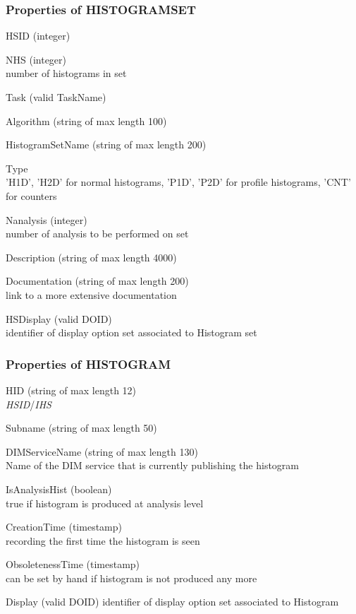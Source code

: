 \documentclass{lhcbnote}
\begin{document}
\subsubsection{Properties of HISTOGRAMSET}
\begin{description}
\item{HSID} (integer)
\item{NHS} (integer)\\
number of histograms in set
\item{Task} (valid TaskName) 
\item{Algorithm} (string of max length 100) 
\item{HistogramSetName} (string of max length 200) 
\item{Type} \\
'H1D', 'H2D' for normal histograms, 'P1D', 'P2D' for profile
histograms, 'CNT' for counters
\item{Nanalysis} (integer)\\
number of analysis to be performed on set
\item{Description} (string of max length 4000) 
\item{Documentation} (string of max length 200)\\
link to a more extensive documentation
\item{HSDisplay} (valid DOID)\\
identifier of display option set associated to Histogram set 
\end{description}

\subsubsection{Properties of HISTOGRAM}
\begin{description}
\item{HID} (string of max length 12)\\
{\it HSID}/{\it IHS}
\item{Subname} (string of max length 50)
\item{DIMServiceName} (string of max length 130)\\
Name of the DIM service that is currently publishing the histogram 
\item{IsAnalysisHist} (boolean)\\
true if histogram is produced at analysis level
\item{CreationTime} (timestamp)\\
recording the first time the histogram is seen
\item{ObsoletenessTime} (timestamp)\\
can be set by hand if histogram is not produced any more 
\item{Display} (valid DOID)
identifier of display option set associated to Histogram 
\end{description}
\end{document}
